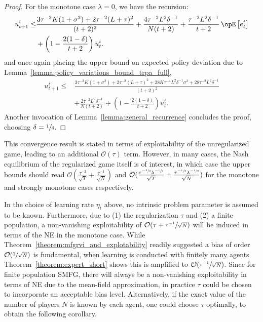 \begin{proof}
For the monotone case $\lambda = 0$, we have the recursion:
\begin{align*}
    u_{t+1}^i \leq &\frac{ 3\tau^{-2}K(1 + \sigma^2) + 2\tau^{-2}(L+\tau)^2}{(t+2)^2} + \frac{4\tau^{-2} L^2 \delta^{-1}}{ N (t+2)} + \frac{ \tau^{-2} L^2\delta^{-1}}{ t+2 } \Exop\left[e_t^i\right] \\
        & + \left(1 - \frac{2 (1-\delta)}{t+2}\right) u_{t}^i.
\end{align*}
and once again placing the upper bound on expected policy deviation due to Lemma~\ref{lemma:policy_variations_bound_trpa_full},
\begin{align*}
    u_{t+1}^i \leq &\frac{ 3\tau^{-2}K(1 + \sigma^2) + 2\tau^{-2}(L+\tau)^2 + 28 K \tau^{-4} L^2\delta^{-1}\sigma^2 +28 \tau^{-2} L^2\delta^{-1}}{(t+2)^2} \\
        &+ \frac{2\tau^{-2} L^2 \delta^{-1}}{ N (t+2)} + \left(1 - \frac{2 (1-\delta)}{t+2}\right) u_{t}^i.
\end{align*}
Another invocation of Lemma~\ref{lemma:general_recurrence} concludes the proof, choosing $\delta=\sfrac{1}{4}$.
\end{proof}

This convergence result is stated in terms of exploitability of the unregularized game, leading to an additional $\mathcal{O}(\tau)$ term.
However, in many cases, the Nash equilibrium of the regularized game itself is of interest, in which case the upper bounds should read
$\mathcal{O} (\frac{\tau^{-2}}{\sqrt{T}}+ \frac{\tau^{-1}}{\sqrt{N}})$
and
$\mathcal{O} (\frac{\tau^{-\sfrac{3}{2}} \lambda^{-\sfrac{1}{2}}}{\sqrt{T}} + \frac{\tau^{-\sfrac{1}{2}} \lambda^{-\sfrac{1}{2}}}{\sqrt{N}})$
for the monotone and strongly monotone cases respectively.

In the choice of learning rate $\eta_t$ above, no intrinsic problem parameter is assumed to be known.
Furthermore, due to (1) the regularization $\tau$ and (2) a finite population, a non-vanishing exploitability of $\mathcal{O}(\tau + \sfrac{\tau^{-1}}{\sqrt{N}})$ will be induced in terms of the NE in the monotone case.
While Theorem~\ref{theorem:mfgrvi_and_explotability} readily suggested a bias of order $\mathcal{O}(\sfrac{1}{\sqrt{N}})$ is fundamental, when learning is conducted with finitely many agents Theorem~\ref{theorem:expert_short} shows this is amplified to $\mathcal{O}(\sfrac{\tau^{-1}}{\sqrt{N}})$.
Since for finite population SMFG, there will always be a non-vanishing exploitability in terms of NE due to the mean-field approximation, in practice $\tau$ could be chosen to incorporate an acceptable bias level.
Alternatively, if the exact value of the number of players $N$ is known by each agent, one could choose $\tau$ optimally, to obtain the following corollary.

